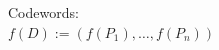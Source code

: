 \documentclass[preview]{standalone}
\begin{document}
\begin{flushleft}
Codewords: \\ $f(D) := (f(P_1), \hdots, f(P_n))$
\end{flushleft}
\end{document}
